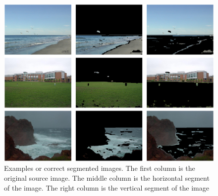 \documentclass[times,10pt,twocolumn]{article}
\begin{document}

\begin{figure}[t]
  \includegraphics[keepaspectratio=true, width=\textwidth]{Good.eps}
  \caption{ Examples or correct segmented images. The first column is the
            original source image. The middle column is the horizontal segment
            of the image. The right column is the vertical segment of the image}
  \label{fig:correct}
\end{figure}




\end{document}
